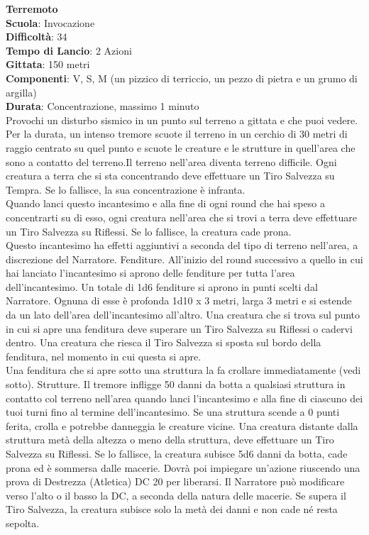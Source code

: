 \begin{multicols}{2}
\medskip\textbf{Terremoto}\\
\textbf{Scuola}: Invocazione\\
\textbf{Difficoltà}: 34\\
\textbf{Tempo di Lancio}: 2 Azioni\\
\textbf{Gittata}: 150 metri\\
\textbf{Componenti}: V, S, M (un pizzico di terriccio, un pezzo di pietra e un grumo di argilla)\\
\textbf{Durata}: Concentrazione, massimo 1 minuto\\
Provochi un disturbo sismico in un punto sul terreno a gittata e che puoi vedere. Per la durata, un intenso tremore scuote il terreno in un cerchio di 30 metri di raggio centrato su quel punto e scuote le creature e le strutture in quell'area che sono a contatto del terreno.Il terreno nell'area diventa terreno difficile. Ogni creatura a terra che si sta concentrando deve effettuare un Tiro Salvezza su Tempra. Se lo fallisce, la sua concentrazione è infranta.\\
Quando lanci questo incantesimo e alla fine di ogni round che hai speso a concentrarti su di esso, ogni creatura nell'area che si trovi a terra deve effettuare un Tiro Salvezza su Riflessi. Se lo fallisce, la creatura cade prona.\\
Questo incantesimo ha effetti aggiuntivi a seconda del tipo di terreno nell'area, a discrezione del Narratore. Fenditure. All'inizio del round successivo a quello in cui hai lanciato l'incantesimo si aprono delle fenditure per tutta l'area dell'incantesimo. Un totale di 1d6 fenditure si aprono in punti scelti dal Narratore. Ognuna di esse è profonda 1d10 x 3 metri, larga 3 metri e si estende da un lato dell'area dell'incantesimo all'altro. Una creatura che si trova sul punto in cui si apre una fenditura deve superare un Tiro Salvezza su Riflessi o cadervi dentro. Una creatura che riesca il Tiro Salvezza si sposta sul bordo della fenditura, nel momento in cui questa si apre.\\
Una fenditura che si apre sotto una struttura la fa crollare immediatamente (vedi sotto). Strutture. Il tremore infligge 50 danni da botta a qualsiasi struttura in contatto col terreno nell'area quando lanci l'incantesimo e alla fine di ciascuno dei tuoi turni fino al termine dell'incantesimo. Se una struttura scende a 0 punti ferita, crolla e potrebbe danneggia le creature vicine. Una creatura distante dalla struttura metà della altezza o meno della struttura, deve effettuare un Tiro Salvezza su Riflessi. Se lo fallisce, la creatura subisce 5d6 danni da botta, cade prona ed è sommersa dalle macerie. Dovrà poi impiegare un'azione riuscendo una prova di Destrezza (Atletica) DC 20 per liberarsi. Il Narratore può modificare verso l'alto o il basso la DC, a seconda della natura delle macerie. Se supera il Tiro Salvezza, la creatura subisce solo la metà dei danni e non cade né resta sepolta.


\end{multicols}
